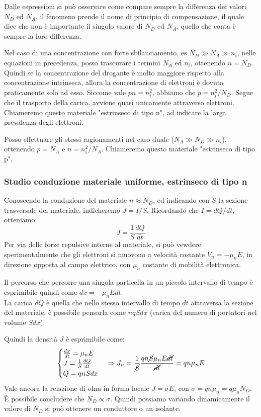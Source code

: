 \documentclass[../template]{subfiles}
\begin{document}
Dalle espressioni si può osservare come compare sempre la differenza dei valori $N_D$ ed $N_A$, il fenomeno prende il nome di principio di compensazione, il quale dice che non è importante il singolo valore di $N_D$ ed $N_A$, quello che conta è sempre la loro differenza.


Nel caso di una concentrazione con forte sbilanciamento, es $N_D \gg N_A \gg n_i$, nelle equazioni in precedenza, posso trascurare i termini $N_A$ ed $n_i$, ottenendo $n = N_D$.
Quindi se la concentrazione del drogante è molto maggiore rispetto alla concentrazione intrinseca, allora la concentrazione di elettroni è dovuta praticamente solo ad esso.
Siccome vale $pn = n_i^2$, abbiamo che $p = n_i^2 / N_D$. Segue che il trasporto della carica, avviene quasi unicamente attraverso elettroni.
\\
Chiameremo questo materiale "estrinseco di tipo n", ad indicare la larga prevalenza degli elettroni.

Posso effettuare gli stessi ragionamenti nel caso duale ($N_A \gg N_D \gg n_i$), ottenendo $p = N_A$ e $n = n_i^2 / N_A$.
Chiameremo questo materiale "estrinseco di tipo p".

\subsubsection{Studio conduzione materiale uniforme, estrinseco di tipo n}

Conoscendo la conduzione del materiale $n \approx N_D$, ed indicando con $S$ la sezione trasversale del materiale, indicheremo $J = I/S$.
Ricordando che $I = dQ/dt$, otteniamo:
\[
    J = \frac{1}{S}\frac{dQ}{dt}
\]
Per via delle forze repulsive interne al materiale, si può vewdere sperimentalmente che gli elettroni si muovono a velocità costante $V_n = -\mu_n E$, in direzione opposta al campo elettrico, con $\mu_n$ costante di mobilità elettronica.

Il percorso che percorre una singola particella in un piccolo intervallo di tempo è esprimibile quindi come $dx = -\mu_n E dt$.
\\
La carica $dQ$ è quella che nello stesso intervallo di tempo $dt$ attraversa la sezione del materiale, è possibile pensarla come $nq S dx$ (carica del numero di portatori nel volume $Sdx$).

Quindi la densità $J$ è esprimibile come:
\[
    \begin{cases}
        \frac{dx}{dt} = \mu_n E
        \\
        J = \frac{1}{S} \frac{dQ}{dt}
        \\
        Q = qnS dx
    \end{cases}
    \Rightarrow
    J_n = \frac{1}{\cancel{S}} \frac{qn\cancel{S} \mu_n E \cancel{dt}}{\cancel{dt}} = qn\mu_n E
\]
Vale ancora la relazione di ohm in forma locale $J = \sigma E$, con $\sigma = qn \mu_n = q \mu_n N_D$.
È possibile concludere che $N_D \propto \sigma$. Quindi possiamo variando dinamicamente il valore di $N_D$ si può ottenere un conduttore o un isolante.
\end{document}
